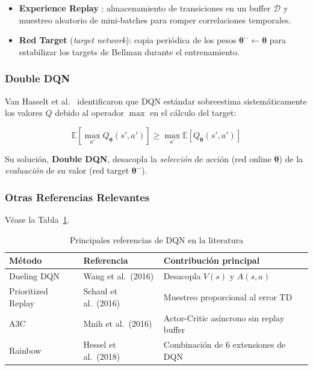 \begin{itemize}
  \item \textbf{Experience Replay} \cite{Lin1992}: almacenamiento de transiciones en un buffer $\mathcal{D}$ y muestreo aleatorio de mini-batches para romper correlaciones temporales.
  \item \textbf{Red Target} (\textit{target network}): copia periódica de los pesos $\boldsymbol{\theta}^- \leftarrow \boldsymbol{\theta}$ para estabilizar los targets de Bellman durante el entrenamiento.
\end{itemize}

\subsubsection{Double DQN}

Van Hasselt et al.~\cite{vanHasselt2016} identificaron que DQN estándar sobreestima sistemáticamente los valores $Q$ debido al operador $\max$ en el cálculo del target:

\begin{equation}
  \mathbb{E}\!\left[\max_{a'} Q_{\boldsymbol{\theta}}(s', a')\right] \geq \max_{a'} \mathbb{E}\!\left[Q_{\boldsymbol{\theta}}(s', a')\right]
\end{equation}

Su solución, \textbf{Double DQN}, desacopla la \textit{selección} de acción (red online $\boldsymbol{\theta}$) de la \textit{evaluación} de su valor (red target $\boldsymbol{\theta}^-$).

\subsubsection{Otras Referencias Relevantes}

Véase la Tabla~\ref{tab:extensiones}.

\begin{table}[htb!]
\caption{Principales referencias de DQN en la literatura}\label{tab:extensiones}
\centering\small
\begin{tabular}{@{}llp{8cm}@{}}
\toprule
\textbf{Método} & \textbf{Referencia} & \textbf{Contribución principal} \\
\midrule
Dueling DQN & Wang et al.~(2016) & Desacopla $V(s)$ y $A(s,a)$ \\
Prioritized Replay & Schaul et al.~(2016) & Muestreo proporcional al error TD \\
A3C & Mnih et al.~(2016) & Actor-Critic asíncrono sin replay buffer \\
Rainbow & Hessel et al.~(2018) & Combinación de 6 extensiones de DQN \\
\bottomrule
\end{tabular}
\end{table}

